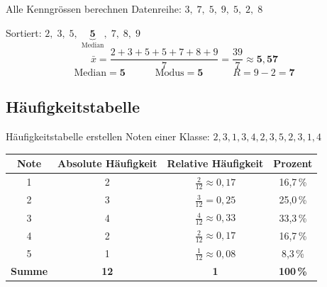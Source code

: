 \documentclass[12pt, a4paper]{article}
\begin{document}
\begin{examplebox}{Alle Kenngr\"ossen berechnen}
Datenreihe: $3,\;7,\;5,\;9,\;5,\;2,\;8$

Sortiert: $2,\;3,\;5,\;\underbrace{\mathbf{5}}_{\text{Median}},\;7,\;8,\;9$
\[
  \bar{x} = \frac{2+3+5+5+7+8+9}{7} = \frac{39}{7} \approx \mathbf{5{,}57}
\]
\[
  \text{Median} = \mathbf{5} \qquad\quad \text{Modus} = \mathbf{5} \qquad\quad R = 9 - 2 = \mathbf{7}
\]

\begin{center}
\end{center}
\end{examplebox}

\subsection{H\"aufigkeitstabelle}

\begin{examplebox}{H\"aufigkeitstabelle erstellen}
Noten einer Klasse: $2, 3, 1, 3, 4, 2, 3, 5, 2, 3, 1, 4$

\begin{center}
\renewcommand{\arraystretch}{1.4}
\begin{tabular}{c c c c}
  \toprule
  \textbf{Note} & \textbf{Absolute H\"aufigkeit} & \textbf{Relative H\"aufigkeit} & \textbf{Prozent} \\
  \midrule
  1 & 2 & $\frac{2}{12} \approx 0{,}17$ & 16{,}7\,\% \\
  2 & 3 & $\frac{3}{12} = 0{,}25$       & 25{,}0\,\% \\
  3 & 4 & $\frac{4}{12} \approx 0{,}33$ & 33{,}3\,\% \\
  4 & 2 & $\frac{2}{12} \approx 0{,}17$ & 16{,}7\,\% \\
  5 & 1 & $\frac{1}{12} \approx 0{,}08$ & 8{,}3\,\%  \\
  \midrule
  \textbf{Summe} & \textbf{12} & \textbf{1} & \textbf{100\,\%} \\
  \bottomrule
\end{tabular}
\end{center}
\end{examplebox}
\end{document}

